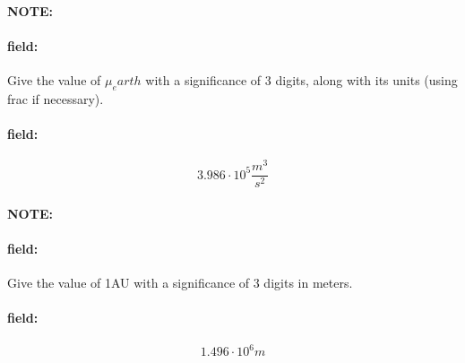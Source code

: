 \documentclass[12pt]{article}
\newenvironment{note}{\paragraph{NOTE:}}{}
\newenvironment{field}{\paragraph{field:}}{}
\begin{document}
\begin{note}
   \begin{field}
       Give the value of \(\mu_earth\) with a significance of 3 digits, along with its units (using frac if necessary).
   \end{field}
   \begin{field}
		\[
			3.986\cdot10^5\frac{m^3}{s^2}
		\]
   \end{field}
\end{note}
\begin{note}
   \begin{field}
       Give the value of 1AU with a significance of 3 digits in meters.
   \end{field}
   \begin{field}
		\[
			1.496\cdot10^6m
		\]
   \end{field}
\end{note}
\end{document}
